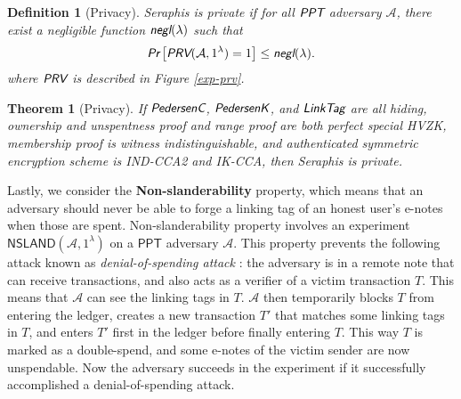 \documentclass{article}
\newtheorem{definition}{Definition}[section]
\newtheorem{theorem}{Theorem}[section]
\begin{document}
\begin{definition}[Privacy]
Seraphis is private if for all $\emph{\textsf{PPT}}$ adversary $\mathcal{A}$, there exist a negligible function $\emph{\textsf{negl}}(\lambda)$ such that
\begin{align*}
\emph{\textsf{Pr}}
\left[
\emph{\textsf{PRV}}(\mathcal{A}, 1^{\lambda})=1
\right]
\le \emph{\textsf{negl}}(\lambda).
\end{align*}
where $\emph{\textsf{PRV}}$ is described in Figure \ref{exp-prv}.
\end{definition}
\begin{theorem}[Privacy]\label{thm-prv}
If $\emph{\textsf{PedersenC}}$, $\emph{\textsf{PedersenK}}$, and $\emph{\textsf{LinkTag}}$ are all hiding, ownership and unspentness proof and range proof are both perfect special HVZK, membership proof is witness indistinguishable, and authenticated symmetric encryption scheme is IND-CCA2 and IK-CCA, then Seraphis is private.  
\end{theorem}

Lastly, we consider the \textbf{Non-slanderability} property, which means that an adversary should never be able to forge a linking tag of an honest user's e-notes when those are spent. Non-slanderability property involves an experiment $\textsf{NSLAND}(\mathcal{A}, 1^{\lambda})$ on a $\textsf{PPT}$ adversary $\mathcal{A}$. This property prevents the following attack known as \textit{denial-of-spending attack} \cite{denial-of-spend}: the adversary is in a remote note that can receive transactions, and also acts as a verifier of a victim transaction $T$. This means that $\mathcal{A}$ can see the linking tags in $T$. $\mathcal{A}$ then temporarily blocks $T$ from entering the ledger, creates a new transaction $T'$ that matches some linking tags in $T$, and enters $T'$ first in the ledger before finally entering $T$. This way $T$ is marked as a double-spend, and some e-notes of the victim sender are now unspendable. Now the adversary succeeds in the experiment if it successfully accomplished a denial-of-spending attack.
\end{document}
